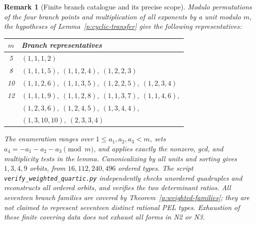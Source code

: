 \documentclass[10pt,reqno]{article}
\theoremstyle{emphasizedplain}
\theoremstyle{emphasizeddefinition}
\theoremstyle{emphasizeddefinition}
\newtheorem{remark}[theorem]{Remark}
\renewcommand{\small}{\fontsize{8.4}{10}\selectfont}
\begin{document}
\begin{remark}[Finite branch catalogue and its precise scope]
Modulo permutations of the four branch points and multiplication of
all exponents by a unit modulo $m$, the hypotheses of
Lemma~\ref{p:cyclic-transfer} give the following representatives:
\begin{center}\small
\begin{tabular}{cl}
\toprule
$m$ & Branch representatives\\\midrule
5 & $(1,1,1,2)$\\
8 & $(1,1,1,5),\ (1,1,2,4),\ (1,2,2,3)$\\
10 & $(1,1,2,6),\ (1,1,3,5),\ (1,2,2,5),\ (1,2,3,4)$\\
12 & $(1,1,1,9),\ (1,1,2,8),\ (1,1,3,7),\ (1,1,4,6),$\\
 & $(1,2,3,6),\ (1,2,4,5),\ (1,3,4,4),$\\
 & $(1,3,10,10),\ (2,3,3,4)$\\\bottomrule
\end{tabular}
\end{center}
The enumeration ranges over $1\le a_1,a_2,a_3<m$, sets
$a_4=-a_1-a_2-a_3\pmod m$, and applies exactly the nonzero, gcd,
and multiplicity tests in the lemma. Canonicalizing by all units and
sorting gives $1,3,4,9$ orbits, from $16,112,240,496$ ordered types.
The script \texttt{verify\_weighted\_quartic.py} independently checks
unordered quadruples and reconstructs all ordered orbits, and verifies
the two determinant ratios. All seventeen branch families are covered
by Theorem~\ref{p:weighted-families}; they are not claimed to represent
seventeen distinct rational PEL types. Exhaustion of these finite
covering data does not exhaust all forms in N2 or N3.
\end{remark}
\end{document}
